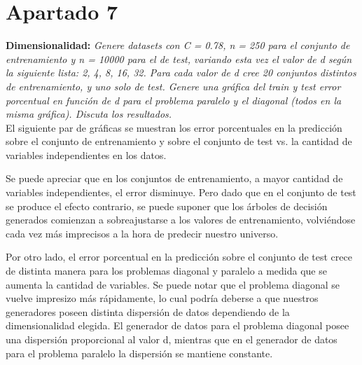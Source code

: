 \documentclass[a4paper, 11pt]{article} %
\begin{document}

\section*{Apartado 7}
\textbf{Dimensionalidad: } \textit{Genere datasets con C = 0.78, n = 250 para
el conjunto de entrenamiento y n = 10000 para el de test, variando esta vez el
valor de d según la siguiente lista: 2, 4, 8, 16, 32. Para cada valor de d cree
20 conjuntos distintos de entrenamiento, y uno solo de test. Genere una gráfica
del train y test error porcentual en función de d para el problema paralelo y
el diagonal (todos en la misma gráfica). Discuta los resultados.}\\

El siguiente par de gráficas se muestran los error porcentuales en la
predicción sobre el conjunto de entrenamiento y sobre el conjunto de test vs.
la cantidad de variables independientes en los datos.

Se puede apreciar que en los conjuntos de entrenamiento, a mayor cantidad de
variables independientes, el error disminuye. Pero dado que en el conjunto de
test se produce el efecto contrario, se puede suponer que los árboles de
decisión generados comienzan a sobreajustarse a los valores de entrenamiento,
volviéndose cada vez más imprecisos a la hora de predecir nuestro universo.

Por otro lado, el error porcentual en la predicción sobre el conjunto de test
crece de distinta manera para los problemas diagonal y paralelo a medida que se
aumenta la cantidad de variables. Se puede notar que el problema diagonal se
vuelve impresizo más rápidamente, lo cual podría deberse a que nuestros
generadores poseen distinta dispersión de datos dependiendo de la
dimensionalidad elegida. El generador de datos para el problema diagonal posee
una dispersión proporcional al valor d, mientras que en el generador de datos
para el problema paralelo la dispersión se mantiene constante.
\end{document}
